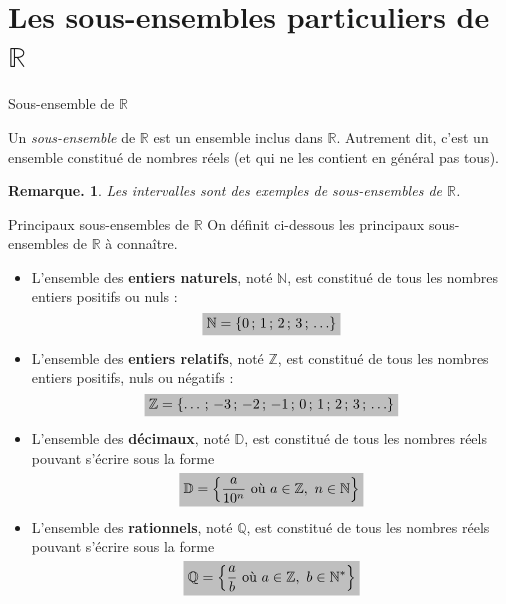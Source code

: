 \documentclass[12pt]{article}
\theoremstyle{break}
\newtheorem*{remark}{Remarque.}
\begin{document}
\newpage

\section{Les sous-ensembles particuliers de $\mathbb{R}$}

\begin{definition}{Sous-ensemble de $\mathbb{R}$}{}
  \begin{multihide}
  Un \emph{sous-ensemble} de $\mathbb{R}$ est un ensemble inclus dans $\mathbb{R}$. Autrement dit, c'est un ensemble constitué de nombres réels (et qui ne les contient en général pas tous).
  \end{multihide}
\end{definition}

\begin{remark}
  Les intervalles sont des exemples de sous-ensembles de $\mathbb{R}$.
\end{remark}

\begin{definition}{Principaux sous-ensembles de $\mathbb{R}$}{}
  On définit ci-dessous les principaux sous-ensembles de $\mathbb{R}$ à connaître.
  \begin{itemize}
    \item L'ensemble des \textbf{entiers naturels}, noté $\mathbb{N}$, est constitué de tous les nombres entiers positifs ou nuls :
    $$\hideM{\mathbb{N} = \{0\,;\,1\,;\,2\,;\,3\,;\,\ldots\}}$$
    \item L'ensemble des \textbf{entiers relatifs}, noté $\mathbb{Z}$, est constitué de tous les nombres entiers positifs, nuls ou négatifs :
    $$\hideM{\mathbb{Z} = \{\ldots\,;\,-3\,;\,-2\,;\,-1\,;\,0\,;\,1\,;\,2\,;\,3\,;\,\ldots\}}$$
    \item L'ensemble des \textbf{décimaux}, noté $\mathbb{D}$, est constitué de tous les nombres réels pouvant s'écrire sous la forme 
    $$\hideM{\mathbb{D} = \left\{\dfrac{a}{10^n} \text{ où } a \in \mathbb{Z},\ n \in \mathbb{N}\right\}}$$
    \item L'ensemble des \textbf{rationnels}, noté $\mathbb{Q}$, est constitué de tous les nombres réels pouvant s'écrire sous la forme 
    $$\hideM{\mathbb{Q} = \left\{\dfrac{a}{b} \text{ où } a \in \mathbb{Z},\ b \in \mathbb{N}^*\right\}}$$
  \end{itemize}
\end{definition}
\end{document}
